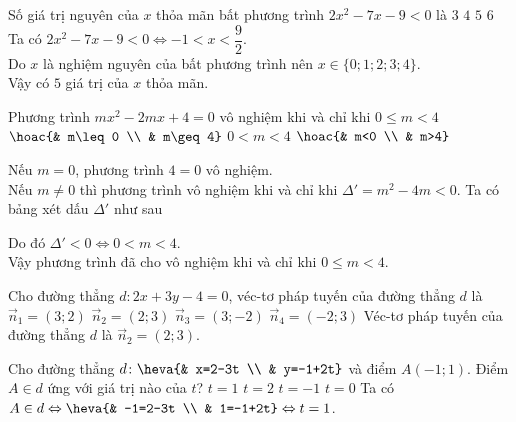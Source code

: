 \begin{ex}%
	Số giá trị nguyên của $x$ thỏa mãn bất phương trình $2x^2-7x-9<0$ là
	\choice
	{$3$}
	{$4$}
	{\True $5$}
	{$6$}
	\loigiai
	{Ta có $2x^2-7x-9<0 \Leftrightarrow -1<x<\dfrac{9}{2}$.\\
		Do $x$ là nghiệm nguyên của bất phương trình nên $x\in \{0;1;2;3;4\}$.\\
		Vậy có $5$ giá trị của $x$ thỏa mãn.}
\end{ex}

\begin{ex}%
	Phương trình $mx^2-2mx+4=0$ vô nghiệm khi và chỉ khi
	\choice
	{\True $0\leq m<4$}
	{$\hoac{& m\leq 0 \\ & m\geq 4}$}
	{$0<m<4$}
	{$\hoac{& m<0 \\ & m>4}$}
	\loigiai
	{Nếu $m=0$, phương trình $4=0$ vô nghiệm.\\
		Nếu $m\neq 0$ thì phương trình vô nghiệm khi và chỉ khi $\Delta'=m^2-4m<0$. Ta có bảng xét dấu $\Delta'$ như sau
		\begin{center}
		\end{center}
		Do đó $\Delta'<0  \Leftrightarrow 0<m<4$.\\
		Vậy phương trình đã cho vô nghiệm khi và chỉ khi $0\leq m<4$.}
\end{ex}

\begin{ex}%
	Cho đường thẳng $d\colon 2x+3y-4=0$, véc-tơ pháp tuyến của đường thẳng $d$ là
	\choice
	{$\overrightarrow{n}_1=(3;2)$}
	{\True $\overrightarrow{n}_2=(2;3)$}
	{$\overrightarrow{n}_3=(3;-2)$}
	{$\overrightarrow{n}_4=(-2;3)$}
	\loigiai
	{Véc-tơ pháp tuyến của đường thẳng $d$ là $\overrightarrow{n}_2=(2;3)$.}
\end{ex}

\begin{ex}%
	Cho đường thẳng $d\colon \heva{& x=2-3t \\ & y=-1+2t}$ và điểm $A(-1;1)$. Điểm $A\in d$ ứng với giá trị nào của $t$?
	\choice
	{\True $t=1$}
	{$t=2$}
	{$t=-1$}
	{$t=0$}
	\loigiai
	{Ta có $A\in d \Leftrightarrow \heva{& -1=2-3t \\ & 1=-1+2t} \Leftrightarrow t=1$.}
\end{ex}


